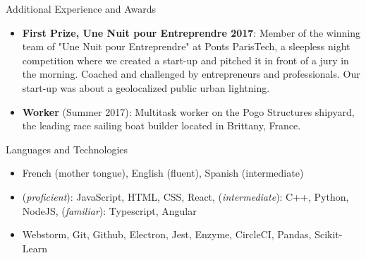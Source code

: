 \documentclass[]{mcdowellcv}
\begin{document}
    \begin{cvsection}{Additional Experience and Awards}
        \begin{cvsubsection}{}{}{}
            \begin{itemize}

                \item \textbf{First Prize, Une Nuit pour Entreprendre 2017}: Member of the winning team of "Une Nuit pour Entreprendre" at Ponts ParisTech, a sleepless
                night competition where we created a start-up and pitched it in front of a jury in the morning.
                Coached and challenged by entrepreneurs and professionals.
                Our start-up was about a geolocalized public urban lightning.

                \item \textbf{Worker} (Summer 2017): Multitask worker on the Pogo Structures shipyard, the leading race sailing boat builder located in Brittany, France.

            \end{itemize}
        \end{cvsubsection}
    \end{cvsection}

    \begin{cvsection}{Languages and Technologies}
        \begin{cvsubsection}{}{}{}
            \begin{itemize}
                \item French (mother tongue), English (fluent), Spanish (intermediate)
                \item (\textit{proficient}): JavaScript, HTML, CSS, React, (\textit{intermediate}): C++, Python, NodeJS, (\textit{familiar}): Typescript, Angular
                \item Webstorm, Git, Github, Electron, Jest, Enzyme, CircleCI, Pandas, Scikit-Learn
            \end{itemize}
        \end{cvsubsection}
    \end{cvsection}
\end{document}
